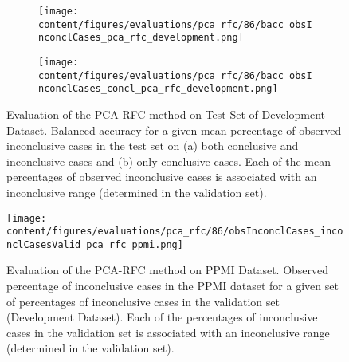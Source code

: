\begin{figure}[t]
  \begin{subfigure}{0.9\textwidth}
    \centering
    \texttt{[image: content/figures/evaluations/pca\_rfc/86/bacc\_obsInconclCases\_pca\_rfc\_development.png]}
    \subcaption{}
    \label{fig:bacc_obsInconclCases_pca_rfc_development}
  \end{subfigure}
  \hfill
  \begin{subfigure}{0.9\textwidth}
    \centering
    \texttt{[image: content/figures/evaluations/pca\_rfc/86/bacc\_obsInconclCases\_concl\_pca\_rfc\_development.png]}
    \subcaption{}
    \label{fig:bacc_obsInconclCases_concl_pca_rfc_development}
  \end{subfigure}

  \caption{Evaluation of the PCA-RFC method on Test Set of Development Dataset.
  Balanced accuracy for a given mean percentage of observed inconclusive cases in the test set on 
  (a) both conclusive and inconclusive cases and (b) only conclusive cases. 
  Each of the mean percentages of observed inconclusive cases is associated with an inconclusive range (determined in the validation set). }
  \label{fig:bacc_obsInconclCases_pca_rfc_development_full}
\end{figure}




\begin{figure}[h]
\centering
\texttt{[image: content/figures/evaluations/pca\_rfc/86/obsInconclCases\_inconclCasesValid\_pca\_rfc\_ppmi.png]}
\caption{Evaluation of the PCA-RFC method on PPMI Dataset.
Observed percentage of inconclusive cases in the PPMI dataset 
for a given set of percentages of inconclusive cases in the validation set (Development Dataset).
Each of the percentages of inconclusive cases in the validation set is associated 
with an inconclusive range (determined in the validation set).} 
\label{fig:obsInconclCases_inconclCasesValid_pca_rfc_ppmi}
\end{figure} 


